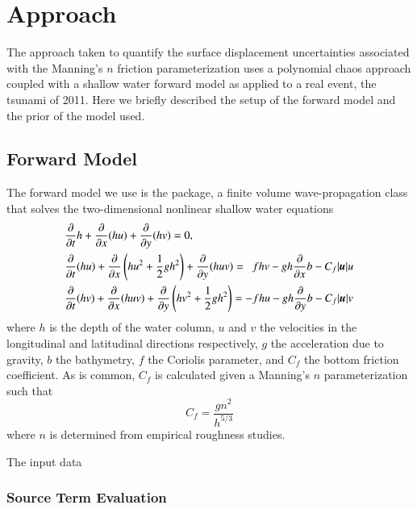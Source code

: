 
\section{Approach}

The approach taken to quantify the surface displacement uncertainties associated with the Manning's $n$ friction parameterization uses a polynomial chaos approach coupled with a shallow water forward model as applied to a real event, the \tohoku tsunami of 2011.  Here we briefly described the setup of the forward model and the prior of the model used.

\subsection{Forward Model}

The forward model we use is the \geoclaw package, a finite volume wave-propagation class that solves the two-dimensional nonlinear shallow water equations  
\begin{equation} \label{eq:swe}
    \begin{aligned}
    &\pd{}{t} h + \pd{}{x} (hu) + \pd{}{y} (hv) = 0, \\
    &\pd{}{t}(hu) + \pd{}{x} \left(hu^2 + \frac{1}{2} g h^2 \right ) + \pd{}{y} (huv) = ~~ fhv - gh \pd{}{x} b - C_f |\vec{u}| u \\
    &\pd{}{t} (hv) + \pd{}{x} (huv) + \pd{}{y} \left (hv^2 + \frac{1}{2} gh^2 \right) = -fhu - gh \pd{}{y} b - C_f |\vec{u}| v
    \end{aligned}
\end{equation}
where $h$ is the depth of the water column, $u$ and $v$ the velocities in the longitudinal and latitudinal directions respectively, $g$ the acceleration due to gravity, $b$ the bathymetry, $f$ the Coriolis parameter, and $C_f$ the bottom friction coefficient.  As is common, $C_f$ is calculated given a Manning's $n$ parameterization such that
\begin{equation}
    C_f = \frac{g n^2}{h^{5/3}}
\end{equation}
where $n$ is determined from empirical roughness studies.

The input data 


\subsubsection{Source Term Evaluation} \label{ssub:source_term_numerics}

